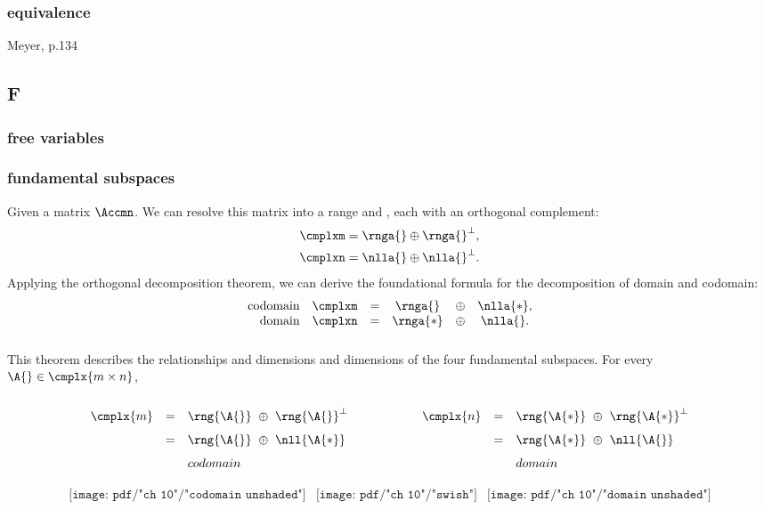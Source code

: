 \subsubsection*{equivalence}
Meyer, p.134

\subsection*{F} 

\subsubsection*{free variables}

\subsubsection*{fundamental subspaces}
Given a matrix $\Accmn$. We can resolve this matrix into a range and \ns, each with an orthogonal complement:
\begin{equation}
  \begin{split}
    \cmplxm &= \rnga{} \oplus \rnga{}^{\perp}, \\
    \cmplxn &= \nlla{} \oplus \nlla{}^{\perp}.
  \end{split}\end{equation}
Applying the orthogonal decomposition theorem, we can derive the foundational formula for the decomposition of domain and codomain:
\begin{equation}
  \begin{array}{rrcccc}
    \text{codomain} & \cmplxm &=& \rnga{}  & \oplus & \nlla{*}, \\
      \text{domain} & \cmplxn &=& \rnga{*} & \oplus & \nlla{}.
  \end{array}
\end{equation}

\subsubsection*{\ftola}
This theorem describes the relationships and dimensions and dimensions of the four fundamental subspaces.
For every $ \A{} \in \cmplx{ m \times n } $,
$$
\begin{array}{ lclclcl }
\\
  \cmplx{ m } & = & \rng{\A{}} \ \oplus \  \rng{\A{}}^{ \perp } & \qquad \qquad & \cmplx{ n } & = & \rng{\A{*}} \ \oplus \  \rng{\A{*}}^{ \perp } \\[7pt]
  & = & \rng{\A{}} \ \oplus \  \nll{\A{*}} & \qquad \qquad & & = & \rng{\A{*}} \ \oplus \  \nll{\A{}} \\[7pt]
  & &  codomain & & & &  domain \\[5pt]
\end{array}
$$
$$
\begin{array}{ccc}
\texttt{[image: pdf/"ch 10"/"codomain unshaded"]} &
\texttt{[image: pdf/"ch 10"/"swish"]} &
\texttt{[image: pdf/"ch 10"/"domain unshaded"]}
\end{array}
$$

